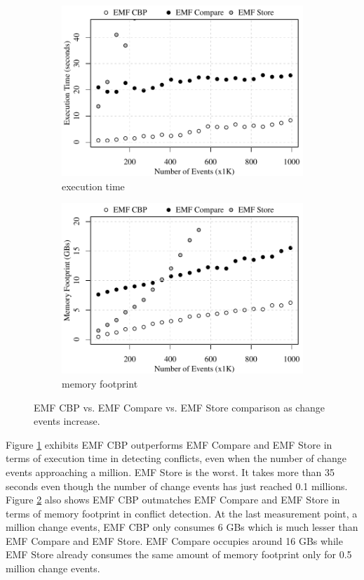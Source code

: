 \begin{figure}[ht]
\begin{subfigure}[t]{0.490\linewidth}
    \includegraphics[width=\linewidth]{conflict-time-events}
    \caption{execution time}
    \label{fig:conflict-time-events}
  \end{subfigure}
  \hfill
  \begin{subfigure}[t]{0.490\linewidth}
    \includegraphics[width=\linewidth]{conflict-memory-events}
    \caption{memory footprint}
    \label{fig:conflict-memory-events}
  \end{subfigure}
  \caption{EMF CBP vs. EMF Compare vs. EMF Store comparison as change events increase.}
  \label{fig:conflict_events}
\end{figure}

Figure \ref{fig:conflict-time-events} exhibits EMF CBP outperforms EMF Compare and EMF Store in terms of execution time in detecting conflicts, even when the number of change events approaching a million. EMF Store is the worst. It takes more than 35 seconds even though the number of change events has just reached 0.1 millions. Figure \ref{fig:conflict-memory-events} also shows EMF CBP outmatches EMF Compare and EMF Store in terms of memory footprint in conflict detection. At the last measurement point, a million change events, EMF CBP only consumes 6 GBs which is much lesser than EMF Compare and EMF Store. EMF Compare occupies around 16 GBs while EMF Store already consumes the same amount of memory footprint only for 0.5 million change events.

